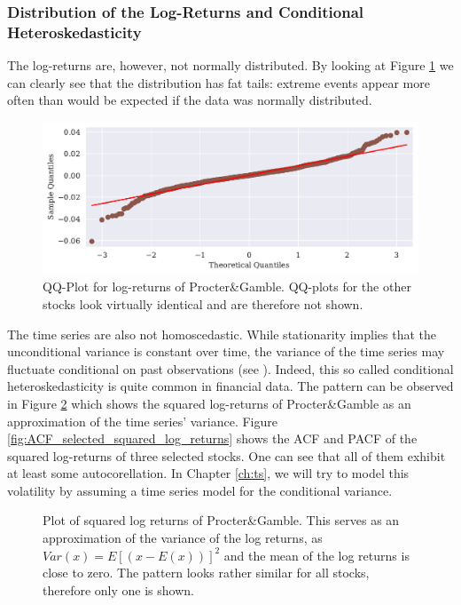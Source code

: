 \subsubsection{Distribution of the Log-Returns and Conditional Heteroskedasticity}
The log-returns are, however, not normally distributed. By looking at Figure \ref{fig:PG_qq_fd_log_adjclose} we can clearly see that the distribution has fat tails: extreme events appear more often than would be expected if the data was normally distributed. 
\begin{figure}[h!]
    \centering
    \begin{adjustbox}{width=.9\textwidth,center}
    \includegraphics[]{figures/PG_log_adjclose_fd_and_qq.pdf}
    \end{adjustbox}  
    \caption{QQ-Plot for log-returns of Procter\&Gamble. QQ-plots for the other stocks look virtually identical and are therefore not shown.}
    \label{fig:PG_qq_fd_log_adjclose}
\end{figure}
The time series are also not homoscedastic. While stationarity implies that the unconditional variance is constant over time, the variance of the time series may fluctuate conditional on past observations (see \citep{engle_autoregressive_1982}). Indeed, this so called conditional heteroskedasticity is quite common in financial data. The pattern can be observed in Figure \ref{fig:PG_squared_log_returns} which shows the squared log-returns of Procter\&Gamble as an approximation of the time series' variance. Figure \ref{fig:ACF_selected_squared_log_returns} shows the ACF and PACF of the squared log-returns of three selected stocks. One can see that all of them exhibit at least some autocorellation. In Chapter \ref{ch:ts}, we will try to model this volatility by assuming a time series model for the conditional variance. 

\begin{figure}[h!]
    \centering
    \begin{adjustbox}{width=.95\textwidth,center}
    
    \end{adjustbox}  
    \caption{Plot of squared log returns of Procter\&Gamble. This serves as an approximation of the variance of the log returns, as $Var(x) = E [(x - E(x))]^2$ and the mean of the log returns is close to zero. The pattern looks rather similar for all stocks, therefore only one is shown.}
    \label{fig:PG_squared_log_returns}
\end{figure}{}

